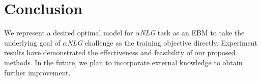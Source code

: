 \section{Conclusion}

We represent a desired optimal model for $\alpha$\textit{NLG} task as an EBM 
to take the underlying goal of $\alpha$\textit{NLG} challenge as the training 
objective directly. Experiment results have demonstrated the effectiveness 
and feasibility of our proposed methods. In the future, we plan to incorporate
external knowledge to obtain further improvement.